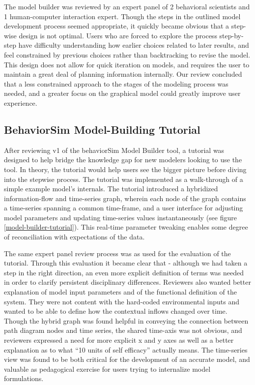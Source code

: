 \documentclass{sigchi}
\begin{document}
The model builder was reviewed by an expert panel of 2 behavioral scientists and 1 human-computer interaction expert. 
Though the steps in the outlined model development process seemed appropriate, it quickly became obvious that a step-wise design is not optimal.
Users who are forced to explore the process step-by-step have difficulty understanding how earlier choices related to later results, and feel constrained by previous choices rather than backtracking to revise the model.
This design does not allow for quick iteration on models, and requires the user to maintain a great deal of planning information internally.
Our review concluded that a less constrained approach to the stages of the modeling process was needed, and a greater focus on the graphical model could greatly improve user experience.

\subsection{BehaviorSim Model-Building Tutorial}
After reviewing v1 of the behaviorSim Model Builder tool, a tutorial was designed to help bridge the knowledge gap for new modelers looking to use the tool.
In theory, the tutorial would help users see the bigger picture before diving into the stepwise process.
The tutorial was implemented as a walk-through of a simple example model's internals.
The tutorial introduced a hybridized information-flow and time-series graph, wherein each node of the graph contains a time-series spanning a common time-frame, and a user interface for adjusting model parameters and updating time-series values instantaneously (see figure \ref{model-builder-tutorial}).
This real-time parameter tweaking enables some degree of reconciliation with expectations of the data.

The same expert panel review process was as used for the evaluation of the tutorial. 
Through this evaluation it became clear that - although we had taken a step in the right direction, an even more explicit definition of terms was needed in order to clarify persistent disciplinary differences.
Reviewers also wanted better explanation of model input parameters and of the functional definition of the system.
They were not content with the hard-coded environmental inputs and wanted to be able to define how the contextual inflows changed over time.
Though the hybrid graph was found helpful in conveying the connection between path diagram nodes and time series, the shared time-axis was not obvious, and reviewers expressed a need for more explicit x and y axes as well as a better explanation as to what ``10 units of self efficacy'' actually means.
The time-series view was found to be both critical for the development of an accurate model, and valuable as pedagogical exercise for users trying to internalize model formulations.
 
\end{document}

